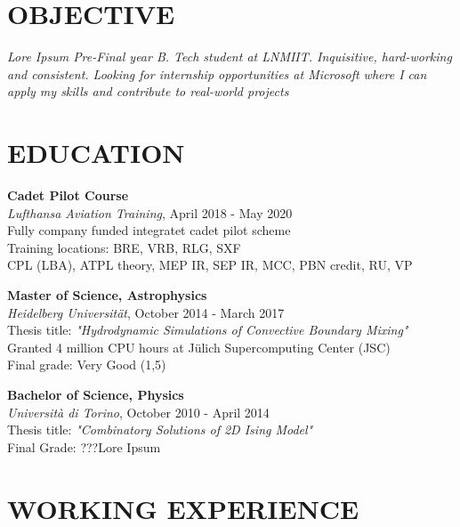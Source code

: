 \documentclass[margin]{res}
\begin{document}
\begin{resume}

\section{OBJECTIVE}
{\sl Lore Ipsum Pre-Final year B. Tech student at LNMIIT. Inquisitive, hard-working and consistent. Looking for internship opportunities at Microsoft where I can apply my skills and contribute to real-world projects }

\section{EDUCATION}

\textbf{Cadet Pilot Course}\\
{\sl Lufthansa Aviation Training}, April 2018 - May 2020\\
Fully company funded integratet cadet pilot scheme\\
Training locations: BRE, VRB, RLG, SXF\\
CPL (LBA), ATPL theory, MEP IR, SEP IR, MCC, PBN credit, RU, VP

\textbf{Master of Science, Astrophysics}\\
{\sl Heidelberg Universität}, October 2014 - March 2017\\
Thesis title: \textit{"Hydrodynamic Simulations of Convective Boundary Mixing"}\\
Granted 4 million CPU hours at Jülich Supercomputing Center (JSC)\\
\hfill Final grade: Very Good (1,5)

\textbf{Bachelor of Science, Physics} \\
{\sl Università di Torino}, October 2010 - April 2014\\
Thesis title: \textit{"Combinatory Solutions of 2D Ising Model"}\\
\hfill Final Grade: ???Lore Ipsum

\section{WORKING EXPERIENCE}


\end{resume}
\end{document}
